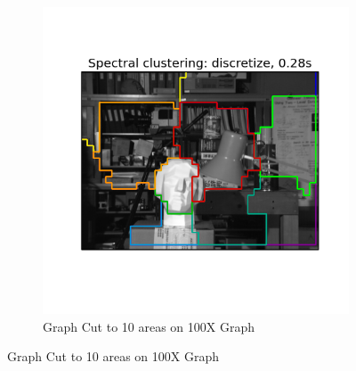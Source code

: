\begin{figure}[h!]
\begin{subfigure}[h]{0.48\textwidth}
                \includegraphics[width=\textwidth]{fig/592_small_10.png}
                \caption{Graph Cut to 10 areas on 100X Graph}
                \label{fig:graphcut_random_small_10}
        \end{subfigure}
        

\end{figure}
